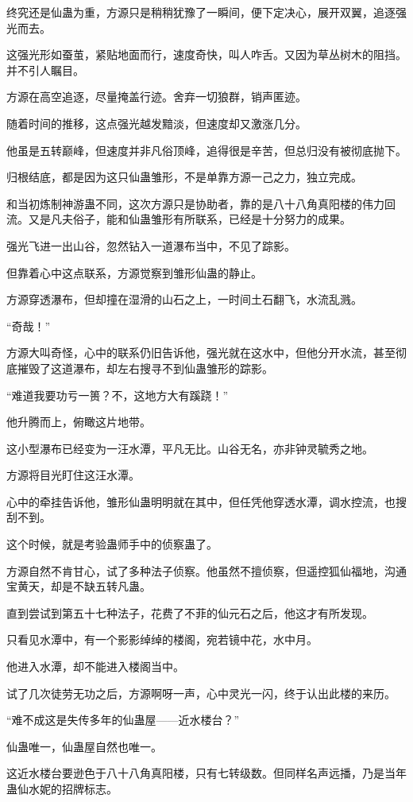 \begin{this_body}
终究还是仙蛊为重，方源只是稍稍犹豫了一瞬间，便下定决心，展开双翼，追逐强光而去。

这强光形如蚕茧，紧贴地面而行，速度奇快，叫人咋舌。又因为草丛树木的阻挡。并不引人瞩目。

方源在高空追逐，尽量掩盖行迹。舍弃一切狼群，销声匿迹。

随着时间的推移，这点强光越发黯淡，但速度却又激涨几分。

他虽是五转巅峰，但速度并非凡俗顶峰，追得很是辛苦，但总归没有被彻底抛下。

归根结底，都是因为这只仙蛊雏形，不是单靠方源一己之力，独立完成。

和当初炼制神游蛊不同，这次方源只是协助者，靠的是八十八角真阳楼的伟力回流。又是凡夫俗子，能和仙蛊雏形有所联系，已经是十分努力的成果。

强光飞进一出山谷，忽然钻入一道瀑布当中，不见了踪影。

但靠着心中这点联系，方源觉察到雏形仙蛊的静止。

方源穿透瀑布，但却撞在湿滑的山石之上，一时间土石翻飞，水流乱溅。

“奇哉！”

方源大叫奇怪，心中的联系仍旧告诉他，强光就在这水中，但他分开水流，甚至彻底摧毁了这道瀑布，却左右搜寻不到仙蛊雏形的踪影。

“难道我要功亏一篑？不，这地方大有蹊跷！”

他升腾而上，俯瞰这片地带。

这小型瀑布已经变为一汪水潭，平凡无比。山谷无名，亦非钟灵毓秀之地。

方源将目光盯住这汪水潭。

心中的牵挂告诉他，雏形仙蛊明明就在其中，但任凭他穿透水潭，调水控流，也搜刮不到。

这个时候，就是考验蛊师手中的侦察蛊了。

方源自然不肯甘心，试了多种法子侦察。他虽然不擅侦察，但遥控狐仙福地，沟通宝黄天，却是不缺五转凡蛊。

直到尝试到第五十七种法子，花费了不菲的仙元石之后，他这才有所发现。

只看见水潭中，有一个影影绰绰的楼阁，宛若镜中花，水中月。

他进入水潭，却不能进入楼阁当中。

试了几次徒劳无功之后，方源啊呀一声，心中灵光一闪，终于认出此楼的来历。

“难不成这是失传多年的仙蛊屋——近水楼台？”

仙蛊唯一，仙蛊屋自然也唯一。

这近水楼台要逊色于八十八角真阳楼，只有七转级数。但同样名声远播，乃是当年蛊仙水妮的招牌标志。


\end{this_body}

